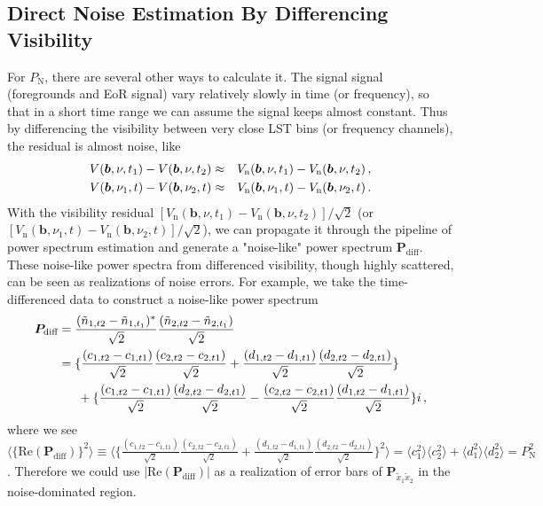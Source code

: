 \documentclass[12pt,a4paper]{article}
\begin{document}
\subsection{Direct Noise Estimation By Differencing Visibility}
\label{subsubsec:diff}
For $P_\text{N}$, there are several other ways to calculate it. The signal signal (foregrounds and EoR signal) vary relatively slowly in time (or frequency), so that in a short time range we can assume the signal keeps almost constant. Thus by differencing the visibility between very close LST bins (or frequency channels), the residual is almost noise, like
\begin{eqnarray}
    V(\bm{b},\nu,t_1) -  V(\bm{b},\nu,t_2) & \approx & V_\text{n}(\bm{b},\nu,t_1) -  V_\text{n}(\bm{b},\nu,t_2) \,, \notag \\
    V(\bm{b},\nu_1,t) -  V(\bm{b},\nu_2,t) & \approx & V_\text{n}(\bm{b},\nu_1, t) -  V_\text{n}(\bm{b},\nu_2, t) \,.\notag \\
\end{eqnarray}
With the visibility residual $[V_\text{n}(\bm{b},\nu,t_1) -  V_\text{n}(\bm{b},\nu,t_2)]/\sqrt{2}$ (or $[V_\text{n}(\bm{b},\nu_1, t) -  V_\text{n}(\bm{b},\nu_2, t)]/\sqrt{2}$), we can propagate it through the pipeline of power spectrum estimation and generate a "noise-like" power spectrum $\bm{P}_\text{diff}$. These noise-like power spectra from differenced visibility, though highly scattered, can be seen as realizations of noise errors. For example, we take the time-differenced data to construct a noise-like power spectrum
\begin{align}
\label{eq:pnn}
    \bm{P}_\text{diff} & =\frac{(\tilde{n}_{1,t2} - \tilde{n}_{1,t_1})^*}{\sqrt{2}}\frac{(\tilde{n}_{2,t2} - \tilde{n}_{2,t_1})}{\sqrt{2}} \notag \\
    & = \{\frac{(c_{1,t2}-c_{1,t1})}{\sqrt{2}}\frac{(c_{2,t2}-c_{2,t1})}{\sqrt{2}} + \frac{(d_{1,t2}-d_{1,t1})}{\sqrt{2}}\frac{(d_{2,t2}-d_{2,t1})}{\sqrt{2}}\} \notag \\
    & \phantom{==} + \{\frac{(c_{1,t2}-c_{1,t1})}{\sqrt{2}}\frac{(d_{2,t2}-d_{2,t1})}{\sqrt{2}}-\frac{(c_{2,t2}-c_{2,t1})}{\sqrt{2}}\frac{(d_{1,t2}-d_{1,t1})}{\sqrt{2}}\}i \,,
\end{align} 
where we see $\langle\{\text{Re}(\bm{P}_\text{diff})\}^2 \rangle \equiv \langle \{\frac{(c_{1,t2}-c_{1,t1})}{\sqrt{2}}\frac{(c_{2,t2}-c_{2,t1})}{\sqrt{2}} + \frac{(d_{1,t2}-d_{1,t1})}{\sqrt{2}}\frac{(d_{2,t2}-d_{2,t1})}{\sqrt{2}}\}^2 \rangle = \langle c_1^2\rangle\langle c_2^2\rangle + \langle d_1^2\rangle\langle d_2^2\rangle = P_\text{N}^2$. Therefore we could use $|\text{Re}(\bm{P}_\text{diff})|$ as a realization of error bars of $\bm{P}_{\tilde{x}_1\tilde{x}_2}$ in the noise-dominated region. 
\end{document}
